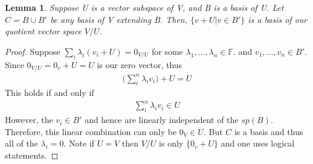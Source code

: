 \documentclass[a4paper, 11pt]{article}
\newtheorem*{lemma}{Lemma}
\newcommand{\F}{\mathbb{F}}
\begin{document}
	\begin{lemma}
		Suppose U is a vector subspace of V, and B is a basis of U. Let $C = B\cup B'$ be any basis of V extending B. Then, $\{v+U | v \in B'\}$ is a basis of our quotient vector space $V/U$. 
	\end{lemma}
	\begin{proof}
		Suppose $\sum_i \lambda_i (v_i+U) = 0_{V/U}$ for some $\lambda_1,..., \lambda_n \in \F$. and $v_1, ... , v_n \in B'$. Since $0_{V/U} = 0_v + U = U$ is our zero vector, thus
			\begin{align*}
				\Big(\sum_i^n \lambda_i v_i\Big) + U = U
			\end{align*} 
		This holds if and only if 
			\begin{align*}
				\sum_i^n \lambda_i v_i \in U
			\end{align*}
		However, the $v_i\in B'$ and hence are linearly independent of the $sp(B)$. Therefore, this linear combination can only be $0_V\in U$. But $C$ is a basis and thus all of the $\lambda_i=0$. Note if $U=V$ then $V/U$ is only $\{0_v + U\}$ and one uses logical statements. 
	\end{proof}
\end{document}
